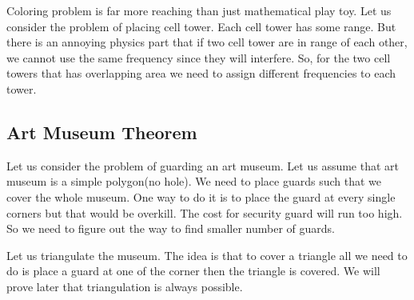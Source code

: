 \documentclass[a4paper, 12pt]{article}
\begin{document}
	Coloring problem is far more reaching than just mathematical play toy. Let us consider the problem of placing cell tower. Each cell tower has some range. But there is an annoying physics part that if two cell tower are in range of each other, we cannot use the same frequency since they will interfere. So, for the two cell towers that has overlapping area we need to assign different frequencies to each tower.
	
	\subsection*{Art Museum Theorem}
	
	Let us consider the problem of guarding an art museum. Let us assume that art museum is a simple polygon(no hole). We need to place guards such that we cover the whole museum. One way to do it is to place the guard at every single corners but that would be overkill. The cost for security guard will run too high. So we need to figure out the way to find smaller number of guards.
	
	\begin{center}
	\end{center}
	
	Let us triangulate the museum. The idea is that to cover a triangle all we need to do is place a guard at one of the corner then the triangle is covered. We will prove later that triangulation is always possible.
	
	\begin{center}
	\end{center}
	
\end{document}
